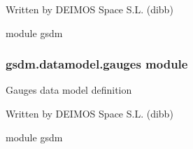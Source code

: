 Written by DEIMOS Space S.L. (dibb)

module gsdm

\begin{fulllineitems}
\label{\detokenize{gsdm.datamodel:gsdm.datamodel.functions.get_resources_path}}
\end{fulllineitems}


\begin{fulllineitems}
\label{\detokenize{gsdm.datamodel:gsdm.datamodel.functions.read_configuration}}
\end{fulllineitems}



\subsubsection{gsdm.datamodel.gauges module}
\label{\detokenize{gsdm.datamodel:module-gsdm.datamodel.gauges}}\label{\detokenize{gsdm.datamodel:gsdm-datamodel-gauges-module}}
Gauges data model definition

Written by DEIMOS Space S.L. (dibb)

module gsdm

